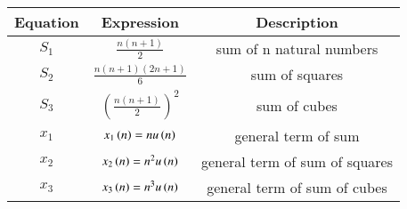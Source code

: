 \begin{tabular}{|c|c|c|}
    \hline
    \textbf{Equation} & \textbf{Expression} & \textbf{Description} \\
    \hline
    \(S_1\) & \(\frac{n(n+1)}{2}\) & sum of n natural numbers\\
    \hline
    \(S_2\) & \(\frac{n(n+1)(2n+1)}{6}\) & sum of squares\\
    \hline
    \(S_3\) & \(\left(\frac{n(n+1)}{2}\right)^2\) & sum of cubes \\
    \hline
    \(x_1\) & \(x_1\left( n \right) = n u\left( n \right)\) & general term of sum \\
    \hline
    \(x_2\) & \(x_2\left( n \right) = n^2 u\left( n \right)\) & general term of sum of squares \\
    \hline
    \(x_3\) & \(x_3\left( n \right) = n^3 u\left( n \right)\) & general term of sum of cubes \\
    \hline
\end{tabular}

